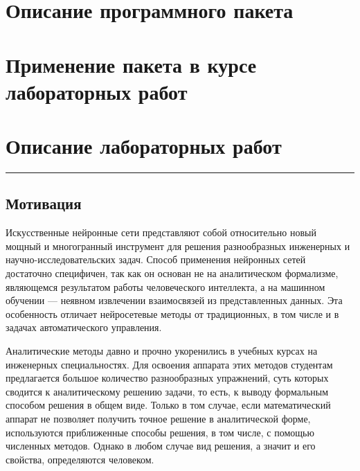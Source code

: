 \section{Описание программного пакета}


\section{Применение пакета в курсе лабораторных работ}


\section{Описание лабораторных работ}




\hrule

\subsection{Мотивация}


Искусственные нейронные сети представляют собой относительно новый
мощный и многогранный инструмент для решения разнообразных инженерных
и научно-исследовательских задач.  Способ применения нейронных сетей
достаточно специфичен, так как он основан не на аналитическом
формализме, являющемся результатом работы человеческого интеллекта, а
на машинном обучении --- неявном извлечении взаимосвязей из
представленных данных.  Эта особенность отличает нейросетевые методы
от традиционных, в том числе и в задачах автоматического управления.

Аналитические методы давно и прочно укоренились в учебных курсах на
инженерных специальностях.  Для освоения аппарата этих методов
студентам предлагается большое количество разнообразных упражнений,
суть которых сводится к аналитическому решению задачи, то есть, к
выводу формальным способом решения в общем виде.  Только в том случае,
если математический аппарат не позволяет получить точное решение в
аналитической форме, используются приближенные способы решения, в том
числе, с помощью численных методов.  Однако в любом случае вид
решения, а значит и его свойства, определяются человеком.

